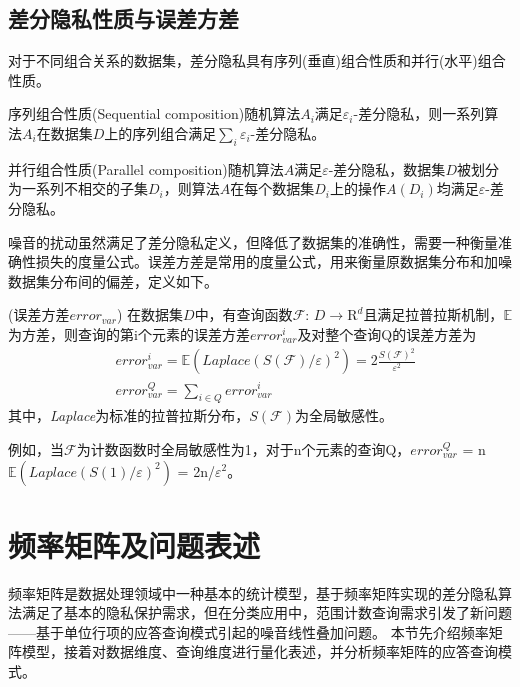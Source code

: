 \subsection{差分隐私性质与误差方差}

对于不同组合关系的数据集，差分隐私具有序列(垂直)组合性质和并行(水平)组合性质。

\begin{lem}
	序列组合性质(Sequential composition)\cite{composition}随机算法$A_{i}$满足$\varepsilon_{i}$-差分隐私，则一系列算法$A_{i}$在数据集$D$上的序列组合满足$\sum\limits_i \varepsilon_{i}$-差分隐私。
\end{lem}

\begin{lem}
	\label{parallel}
	并行组合性质(Parallel composition)\cite{composition}随机算法$A$满足$\varepsilon$-差分隐私，数据集$D$被划分为一系列不相交的子集$D_{i}$，则算法$A$在每个数据集$D_{i}$上的操作$A(D_{i})$均满足$\varepsilon$-差分隐私。
\end{lem}


噪音的扰动虽然满足了差分隐私定义，但降低了数据集的准确性，需要一种衡量准确性损失的度量公式。误差方差是常用的度量公式，用来衡量原数据集分布和加噪数据集分布间的偏差，定义如下。
\begin{defn}
	\label{thm:error}
	(\textsc{误差方差}$error_{var}$\cite{Dwork Calibrating}) 在数据集$D$中，有查询函数$\mathcal{F}$: $D\rightarrow \mathrm{R}^d$且满足拉普拉斯机制，$\mathbb{E}$为方差，则查询的第i个元素的误差方差$error_{var}^{i}$及对整个查询Q的误差方差为
	\begin{eqnarray}
	&error_{var}^{i} = \mathbb{E}(\textit{Laplace}(S(\mathcal{F})/ \varepsilon)^2) = 2\frac{S(\mathcal{F})^2}{\varepsilon^2}\\
	&error_{var}^{Q} = \sum\nolimits_{i \in Q}error_{var}^{i}
	\end{eqnarray}
	其中，\textit{Laplace}为标准的拉普拉斯分布，$S(\mathcal{F})$为全局敏感性。
\end{defn}

例如，当$\mathcal{F}$为计数函数时全局敏感性为1，对于n个元素的查询Q，$error_{var}^{Q}$ = n$\mathbb{E}(\textit{Laplace}(S(1)/ \varepsilon)^2)$ = 2n/$\varepsilon^2$。

\section{频率矩阵及问题表述}

频率矩阵是数据处理领域中一种基本的统计模型，基于频率矩阵实现的差分隐私算法满足了基本的隐私保护需求，但在分类应用中，范围计数查询需求引发了新问题——基于单位行项的应答查询模式引起的噪音线性叠加问题。%
本节先介绍频率矩阵模型，接着对数据维度、查询维度进行量化表述，并分析频率矩阵的应答查询模式。

